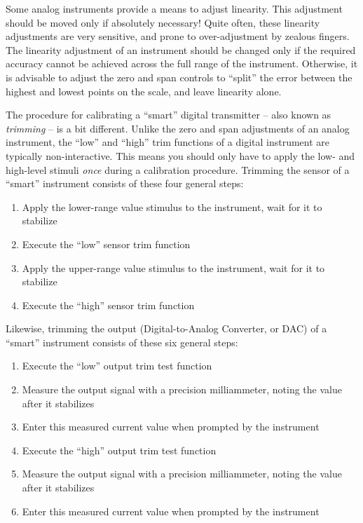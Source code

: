 Some analog instruments provide a means to adjust linearity.  This adjustment should be moved only if absolutely necessary!  Quite often, these linearity adjustments are very sensitive, and prone to over-adjustment by zealous fingers.  The linearity adjustment of an instrument should be changed only if the required accuracy cannot be achieved across the full range of the instrument.  Otherwise, it is advisable to adjust the zero and span controls to ``split'' the error between the highest and lowest points on the scale, and leave linearity alone.

\vskip 10pt

\filbreak

The procedure for calibrating a ``smart'' digital transmitter -- also known as \textit{trimming} -- is a bit different.  Unlike the zero and span adjustments of an analog instrument, the ``low'' and ``high'' trim functions of a digital instrument are typically non-interactive.  This means you should only have to apply the low- and high-level stimuli \textit{once} during a calibration procedure.  Trimming the sensor of a ``smart'' instrument consists of these four general steps:

\begin{enumerate}
\item Apply the lower-range value stimulus to the instrument, wait for it to stabilize
\item Execute the ``low'' sensor trim function
\item Apply the upper-range value stimulus to the instrument, wait for it to stabilize
\item Execute the ``high'' sensor trim function
\end{enumerate}

Likewise, trimming the output (Digital-to-Analog Converter, or DAC) of a ``smart'' instrument consists of these six general steps:

\begin{enumerate}
\item Execute the ``low'' output trim test function
\item Measure the output signal with a precision milliammeter, noting the value after it stabilizes
\item Enter this measured current value when prompted by the instrument
\item Execute the ``high'' output trim test function
\item Measure the output signal with a precision milliammeter, noting the value after it stabilizes
\item Enter this measured current value when prompted by the instrument
\end{enumerate}

